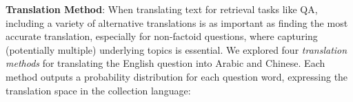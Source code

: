 \documentclass{sig-alternate-05-2015}
\begin{document}
\textbf{Translation Method}:
When translating text for retrieval tasks like QA, including a variety of alternative translations is as important as finding the most accurate 
translation, especially for non-factoid questions, where capturing (potentially multiple) underlying topics is essential.
We explored four \emph{translation methods} for translating
the English question into Arabic and Chinese. Each method outputs a probability distribution for 
each question word, expressing the translation space in the collection language:

\end{document}
